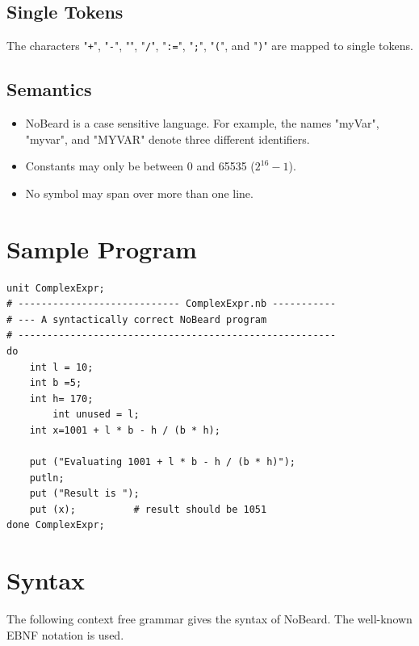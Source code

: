 \documentclass[11pt]{report}
\newcommand{\leongage}{NoBeard}
\begin{document}
\subsection{Single Tokens}
The characters "{\tt+}", "{\tt-}", "{\tt*}", "{\tt/}", "{\tt:=}", "{\tt;}", "{\tt(}", and "{\tt)}" are mapped to single tokens.

\subsection{Semantics}
\begin{itemize}
	\item \leongage{} is a case sensitive language. For example, the names "myVar", "myvar", and "MYVAR" denote three different identifiers.
	\item Constants may only be between 0 and 65535 ($2^{16} - 1$).
	\item No symbol may span over more than one line.
\end{itemize}

\section{Sample Program}
\begin{lstlisting}
unit ComplexExpr;
# ---------------------------- ComplexExpr.nb -----------
# --- A syntactically correct NoBeard program
# -------------------------------------------------------
do
    int l = 10;
    int b =5;
    int h= 170;
        int unused = l;
    int x=1001 + l * b - h / (b * h);

    put ("Evaluating 1001 + l * b - h / (b * h)");
    putln;
    put ("Result is ");
    put (x);          # result should be 1051
done ComplexExpr;
\end{lstlisting}

\section{Syntax}
The following context free grammar gives the syntax of \leongage{}. The well-known EBNF notation is used.
\end{document}
